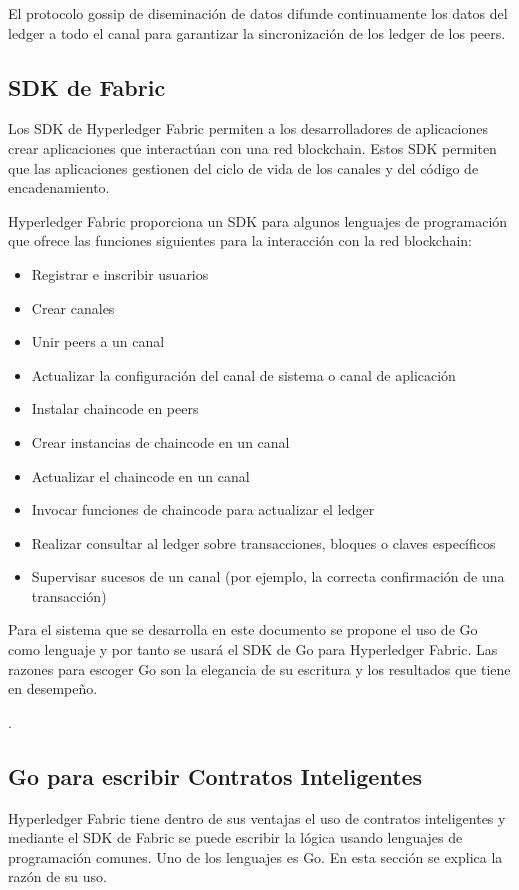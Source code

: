 El protocolo gossip de diseminación de datos difunde continuamente los datos del ledger a todo el canal para garantizar la sincronización de los ledger de los peers.

\subsection{SDK de Fabric}
Los SDK de Hyperledger Fabric permiten a los desarrolladores de aplicaciones crear aplicaciones que interactúan con una red blockchain. Estos SDK permiten que las aplicaciones gestionen del ciclo de vida de los canales y del código de encadenamiento.

Hyperledger Fabric proporciona un SDK para algunos lenguajes de programación que ofrece las funciones siguientes para la interacción con la red blockchain:

\begin{itemize}
	\item Registrar e inscribir usuarios
	\item Crear canales
	\item Unir peers a un canal
	\item Actualizar la configuración del canal de sistema o canal de aplicación
	\item Instalar chaincode en peers
	\item Crear instancias de chaincode en un canal
	\item Actualizar el chaincode en un canal
	\item Invocar funciones de chaincode para actualizar el ledger
	\item Realizar consultar al ledger sobre transacciones, bloques o claves específicos
	\item Supervisar sucesos de un canal (por ejemplo, la correcta confirmación de una transacción)
\end{itemize}

Para el sistema que se desarrolla en este documento se propone el uso de Go como lenguaje y por tanto se usará el SDK de Go para Hyperledger Fabric. Las razones para escoger Go son la elegancia de su escritura y los resultados que tiene en desempeño.

.

\subsection{Go para escribir Contratos Inteligentes}

Hyperledger Fabric tiene dentro de sus ventajas el uso de contratos inteligentes y mediante el SDK de Fabric se puede escribir la lógica usando lenguajes de programación comunes. Uno de los lenguajes es Go. En esta sección se explica la razón de su uso.

